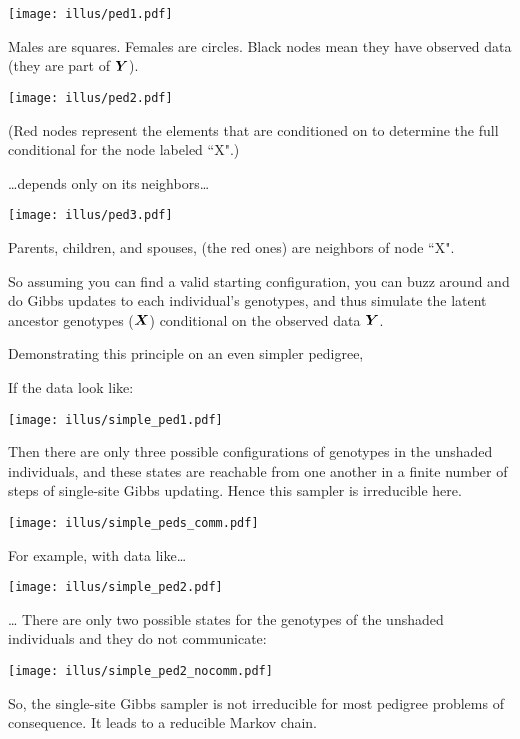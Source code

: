 \begin{center}
\texttt{[image: illus/ped1.pdf]}
\end{center}
Males are squares.  Females are circles.  Black nodes mean they have observed data (\ie they are part of $\bY$).

\begin{center}
\texttt{[image: illus/ped2.pdf]}
\end{center}
(Red nodes represent the elements that are conditioned on to determine the full conditional for the node labeled ``X".)

\ldots depends only on its neighbors\ldots


\begin{center}
\texttt{[image: illus/ped3.pdf]}
\end{center}
Parents, children, and spouses, (the red ones) are neighbors of node ``X".

So assuming you can find a valid starting configuration, you can buzz around and do Gibbs updates to each individual's genotypes, and thus simulate the latent ancestor genotypes ($\bX$) conditional on the observed data $\bY$.  


Demonstrating this principle on an even simpler pedigree,

If the data look like:
\begin{center}
\texttt{[image: illus/simple\_ped1.pdf]}
\end{center}

\newpage
Then there are only three possible configurations of genotypes in the unshaded individuals, and these states are reachable from one another in a finite number of steps of single-site Gibbs updating.  Hence this sampler is irreducible here.
\begin{center}
\texttt{[image: illus/simple\_peds\_comm.pdf]}
\end{center}



For example, with data like\ldots
\begin{center}
\texttt{[image: illus/simple\_ped2.pdf]}
\end{center}
\newpage
\ldots
There are only two possible states for the genotypes of the unshaded individuals and they do not communicate:
\begin{center}
\texttt{[image: illus/simple\_ped2\_nocomm.pdf]}
\end{center}
So, the single-site Gibbs sampler is not irreducible for most pedigree problems of consequence.  It leads to a reducible Markov chain.

